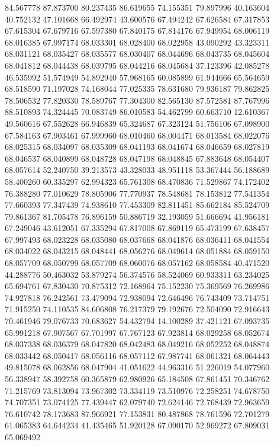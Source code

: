84.567778
87.873700
80.237435
86.619655
74.155351
79.897996
40.163604
40.752132
47.101668
66.492974
43.600576
67.494242
67.626584
67.317853
67.615304
67.679716
67.597380
67.840175
67.814176
67.949954
68.006119
68.016385
67.997174
68.033301
68.028400
68.022958
43.090292
43.323311
68.031121
68.035427
68.035577
68.030407
68.044696
68.043735
68.045604
68.041812
68.044438
68.039795
68.044216
68.045684
37.123396
42.085278
46.535992
51.574949
54.892940
57.968165
60.085899
61.944666
65.564659
68.518590
71.197028
74.168044
77.025335
78.631680
79.936187
79.862825
78.506532
77.820330
78.589767
77.304300
82.565130
87.572581
87.767996
88.510893
74.324445
70.083749
86.010583
54.462799
60.663710
12.610367
49.560616
67.552628
66.946839
65.324687
67.323124
51.756106
67.098900
67.584163
67.903461
67.999960
68.010460
68.004471
68.013584
68.022076
68.025315
68.034097
68.035309
68.041193
68.041674
68.046659
68.027819
68.046537
68.040899
68.048728
68.047198
68.048845
67.883648
68.054407
68.057614
52.240750
39.213573
43.328033
48.951118
53.367444
56.188689
58.400260
60.335297
62.994323
65.761308
68.470836
71.529867
74.172402
76.388280
77.010629
78.805906
77.770937
78.548681
78.153812
77.541354
77.660393
77.347439
74.938610
77.453309
82.811451
85.662184
85.524709
79.861367
81.705478
76.896159
50.886719
32.193059
51.666694
41.956181
67.249046
43.612051
67.335294
67.817008
67.869119
65.473199
67.638457
67.997493
68.023228
68.035080
68.037668
68.041876
68.036411
68.041554
68.034022
68.043215
68.048441
68.056276
68.049614
68.051884
68.059150
68.057709
68.050799
68.057709
68.060076
68.057162
68.058584
40.471520
44.288776
50.463032
53.879274
56.374576
58.524069
60.933311
63.234025
65.694761
67.830430
70.875312
72.168964
75.152230
75.369569
76.269986
74.927818
76.242561
73.479094
72.938094
72.646496
76.743409
73.714751
71.915250
74.110535
84.606808
76.217379
79.192676
72.504090
72.916643
70.461946
79.076733
70.683627
54.432794
14.100289
37.421121
67.093735
65.991218
67.907567
67.701997
67.767123
67.923814
68.029258
68.052674
68.037338
68.036379
68.047820
68.042483
68.049216
68.052252
68.048874
68.033442
68.050417
68.056116
68.057112
67.987741
68.061321
68.064443
49.815078
68.062856
68.047904
41.051622
44.963316
51.226019
54.077960
56.338947
58.392758
60.365879
62.980926
65.184508
67.861451
70.346762
71.215769
73.813094
73.967302
73.334119
73.510976
72.258251
74.678750
74.707351
73.074125
77.439447
62.079740
72.624146
72.768439
72.963659
76.610742
78.173683
87.966921
77.153831
80.487868
78.761596
72.701279
61.065383
64.644234
41.435465
51.920128
67.090170
52.969272
67.809031
65.069492
